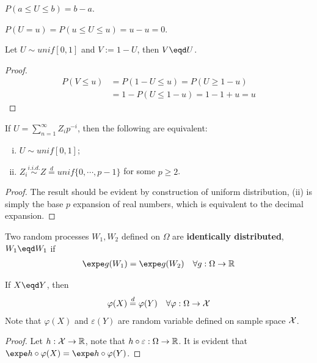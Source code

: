 \documentclass{article}
\begin{document}
   	\begin{proposition}
   		$P(a \leq U \leq b) = b - a$.
   	\end{proposition}
   	
   	\begin{corollary}
   		$P(U = u) = P(u \leq U \leq u) = u - u = 0$.
   	\end{corollary}
   	
   	\begin{proposition}
   		Let $U \sim unif[0, 1]$ and $V:=1-U$, then $V \eqd U$.
   	\end{proposition}
   	
   	\begin{proof}
   		\begin{align}
   			P(V \leq u) &= P(1 - U \leq u) 
   			= P(U \geq 1 - u) \\
   			&= 1 - P(U \leq 1 - u)
   			= 1 - 1 + u = u
   		\end{align}
   	\end{proof}
   	
   	\begin{theorem}
   		If $U = \sum_{n=1}^\infty Z_i p^{-i}$, then the following are equivalent:
   		\begin{enumerate}[(i)]
   			\item $U \sim unif[0, 1]$;
   			\item $Z_i \overset{i.i.d.}{\sim} Z \overset{d}{=} unif\{0, \cdots, p-1\}$ for some $p \geq 2$.
   		\end{enumerate}
   	\end{theorem}
   	
   	\begin{proof}
   		The result should be evident by construction of uniform distribution, (ii) is simply the base $p$ expansion of real numbers, which is equivalent to the decimal expansion.
   	\end{proof}
   	
   	\begin{definition}
   		Two random processes $W_1, W_2$ defined on $\Omega$ are \textbf{identically distributed}, $W_1 \eqd W_1$ if 
   		\begin{align}
   			\expe g(W_1) = \expe g(W_2) \quad \forall g: \Omega \to \R
   		\end{align}
   	\end{definition}
   	
   	\begin{theorem}[Invariance I]
   		If $X \eqd Y$, then 
   		\begin{align}
   			\varphi(X) \overset{d}{=} \varphi(Y)\quad \forall \varphi: \Omega \to \mathcal{{X}}
   		\end{align}
   		Note that $\varphi(X)$ and $\varepsilon(Y)$ are random variable defined on sample space $\mathcal{{X}}$.
   	\end{theorem}
   	\begin{proof}
   		Let $h: \mathcal{{X}} \to \mathbb{R}$, note that $h \circ \varepsilon: \Omega \to \mathbb{R}$. It is evident that $\expe h \circ \varphi(X) = \expe h \circ \varphi(Y)$.
   	\end{proof}
   	
\end{document}
